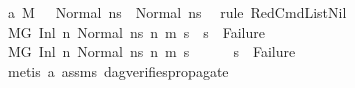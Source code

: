 \begin{isabellebody}
\ a{}{\isacharcolon}{\kern0pt}\ {\isachardoublequoteopen}{\isacharparenleft}{\kern0pt}M{\isacharcomma}{\kern0pt}{\isasymLambda}{\isacharcomma}{\kern0pt}{\isasymGamma}{\isacharcomma}{\kern0pt}{\isasymOmega}\ {\isasymturnstile}\ {\isasymlangle}{\isacharbrackleft}{\kern0pt}{\isacharbrackright}{\kern0pt}{\isacharcomma}{\kern0pt}\ Normal\ ns{}{\isasymrangle}\ {\isacharbrackleft}{\kern0pt}{\isasymrightarrow}{\isacharbrackright}{\kern0pt}\ {\isacharparenleft}{\kern0pt}Normal\ ns{}{\isacharparenright}{\kern0pt}{\isacharparenright}{\kern0pt}{\isachardoublequoteclose}\ \isamarkupfalse%
\ {\isacharparenleft}{\kern0pt}rule\ RedCmdListNil{\isacharparenright}{\kern0pt}\isanewline
\ \ \isamarkupfalse%
\ {\isachardoublequoteopen}{\isacharparenleft}{\kern0pt}M{\isacharcomma}{\kern0pt}{\isasymLambda}{\isacharcomma}{\kern0pt}{\isasymGamma}{\isacharcomma}{\kern0pt}{\isasymOmega}{\isacharcomma}{\kern0pt}G\ {\isasymturnstile}{\isacharparenleft}{\kern0pt}Inl\ n{}{\isacharcomma}{\kern0pt}\ Normal\ ns{}{\isacharparenright}{\kern0pt}\ {\isacharminus}{\kern0pt}n{\isasymrightarrow}{\isacharasterisk}{\kern0pt}\ {\isacharparenleft}{\kern0pt}m{}{\isacharcomma}{\kern0pt}\ s{}{\isacharparenright}{\kern0pt}{\isacharparenright}{\kern0pt}\ {\isasymLongrightarrow}\ s{}\ {\isasymnoteq}\ Failure{\isachardoublequoteclose}\ \isanewline
\ \ \isamarkupfalse%
\ {\isacharminus}{\kern0pt}\isanewline
\ \ \ \ \isamarkupfalse%
\ {\isachardoublequoteopen}{\isacharparenleft}{\kern0pt}M{\isacharcomma}{\kern0pt}{\isasymLambda}{\isacharcomma}{\kern0pt}{\isasymGamma}{\isacharcomma}{\kern0pt}{\isasymOmega}{\isacharcomma}{\kern0pt}G\ {\isasymturnstile}{\isacharparenleft}{\kern0pt}Inl\ n{}{\isacharcomma}{\kern0pt}\ Normal\ ns{}{\isacharparenright}{\kern0pt}\ {\isacharminus}{\kern0pt}n{\isasymrightarrow}{\isacharasterisk}{\kern0pt}\ {\isacharparenleft}{\kern0pt}m{}{\isacharcomma}{\kern0pt}\ s{}{\isacharparenright}{\kern0pt}{\isacharparenright}{\kern0pt}{\isachardoublequoteclose}\isanewline
\ \ \ \ \isamarkupfalse%
\ {\isachardoublequoteopen}s{}\ {\isasymnoteq}\ Failure{\isachardoublequoteclose}\ \isamarkupfalse%
\ {\isacharparenleft}{\kern0pt}metis\ a{}\ assms{\isacharparenleft}{\kern0pt}{}{\isacharminus}{\kern0pt}{}{\isacharparenright}{\kern0pt}\ dag{\isacharunderscore}{\kern0pt}verifies{\isacharunderscore}{\kern0pt}propagate{\isacharparenright}{\kern0pt}\isanewline

\end{isabellebody}
